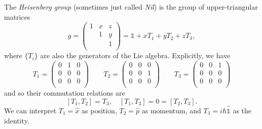 \begin{example}
  The \emph{Heisenberg group} (sometimes just called \emph{Nil}) is the group of upper-triangular matrices
  \begin{equation}
    \label{eq:4-g}
    g = 
    \begin{pmatrix}
     1 & x & z \\
      & 1 & y \\
      &  & 1 \\
    \end{pmatrix}
    = \mathbb{1} + x T_1 + yT_2 + z T_3,
  \end{equation}
  where $\{T_i\}$ are also the generators of the Lie algebra. Explicitly, we have
  \begin{equation}
    T_1 = 
    \begin{pmatrix}
      0& 1 & 0 \\
      0& 0 & 0 \\
      0& 0 & 0 \\
    \end{pmatrix}
    \qquad
    T_2 = 
    \begin{pmatrix}
      0& 0 & 0 \\
      0& 0 & 1 \\
      0& 0 &  0\\
    \end{pmatrix}
    \qquad
    T_3 = 
    \begin{pmatrix}
     0 & 0 & 1 \\
     0 & 0 & 0 \\
     0 & 0 & 0 \\
    \end{pmatrix}
  \end{equation}
  and so their commutation relations are
  \begin{equation}
    \label{eq:heis-la}
    [T_1, T_2] = T_3, \quad [T_1, T_3] = 0 = [T_2, T_3].
  \end{equation}
  We can interpret $T_1 = \hat{x}$ as position, $T_2 = \hat{p}$ as momentum, and $T_3 = i \hbar \hat{\mathbb{1}}$ as the identity.
\end{example}
